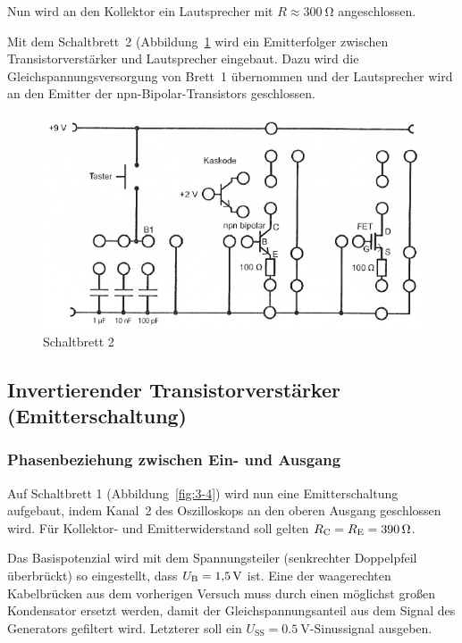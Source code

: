 Nun wird an den Kollektor ein Lautsprecher mit $R \approx \SI{300}{\ohm}$
angeschlossen. 


Mit dem Schaltbrett~2 (Abbildung~\ref{fig:3-5} wird ein Emitterfolger zwischen
Transistorverstärker und Lautsprecher eingebaut. Dazu wird die
Gleichspannungsversorgung von Brett~1 übernommen und der Lautsprecher wird an
den Emitter der npn-Bipolar-Transistors geschlossen.

\begin{figure}
	\centering
	\includegraphics[width=\textwidth]{Anleitung/3-5.png}
	\caption{%
		Schaltbrett 2
	}
	\label{fig:3-5}
\end{figure}


\subsection{Invertierender Transistorverstärker (Emitterschaltung)}

\subsubsection{Phasenbeziehung zwischen Ein- und Ausgang}

Auf Schaltbrett 1 (Abbildung~\ref{fig:3-4}) wird nun eine Emitterschaltung
aufgebaut, indem Kanal~2 des Oszilloskops an den oberen Ausgang geschlossen
wird. Für Kollektor- und Emitterwiderstand soll gelten $R_\text{C} = R_\text{E} =
\SI{390}{\ohm}$.

Das Basispotenzial wird mit dem Spannungsteiler (senkrechter Doppelpfeil
überbrückt) so eingestellt, dass $U_\text{B} = \SI {1.5}{\volt}$ ist.  Eine der
waagerechten Kabelbrücken aus dem vorherigen Versuch muss durch einen möglichst
großen Kondensator ersetzt werden, damit der Gleichspannungsanteil aus dem
Signal des Generators gefiltert wird. Letzterer soll ein
$U_\text{SS}=\SI{0.5}{\volt}$-Sinussignal ausgeben.

